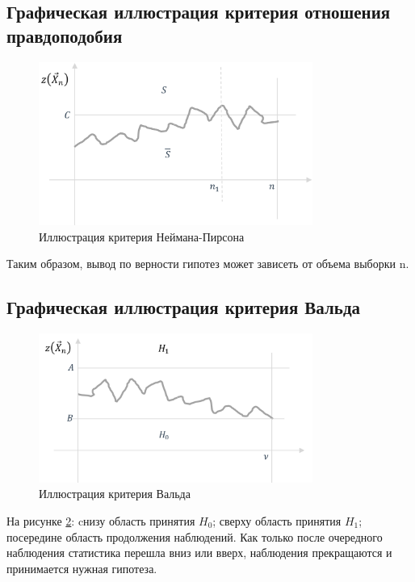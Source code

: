 \subsection{Графическая иллюстрация критерия отношения правдоподобия}

\begin{figure}[h!]
  \centering
  \includegraphics[width=0.8\textwidth]{Figures/10-plot1.png}
  \caption{Иллюстрация критерия Неймана-Пирсона}
  \label{fig:10-plot1}
\end{figure}

Таким образом, вывод по верности гипотез может зависеть от объема выборки n.

\subsection{Графическая иллюстрация критерия Вальда}

\begin{figure}[h!]
  \centering
  \includegraphics[width=0.8\textwidth]{Figures/10-plot2.png}
  \caption{Иллюстрация критерия Вальда}
  \label{fig:10-plot2}
\end{figure}

На рисунке \ref{fig:10-plot2}:
cнизу область принятия $H_0$;
сверху область принятия $H_1$;
посередине область продолжения наблюдений.
Как только после очередного наблюдения статистика перешла вниз или вверх, наблюдения прекращаются и принимается нужная гипотеза.

